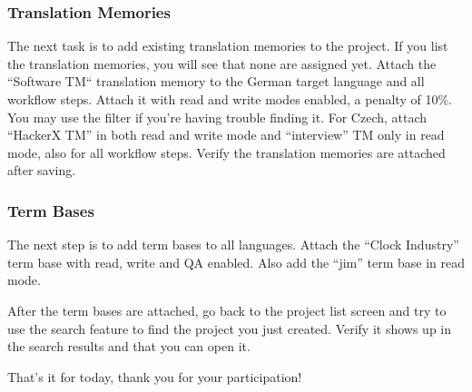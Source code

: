 \subsubsection{Translation Memories}

The next task is to add existing translation memories to the project. If you list the translation memories, you will see that none are assigned yet. Attach the “Software TM“ translation memory to the German target language and all workflow steps. Attach it with read and write modes enabled, a penalty of 10\%. You may use the filter if you’re having trouble finding it. For Czech, attach “HackerX TM” in both read and write mode and “interview” TM only in read mode, also for all workflow steps. Verify the translation memories are attached after saving.

\subsubsection{Term Bases}

The next step is to add term bases to all languages.
Attach the “Clock Industry” term base with read, write and QA enabled. Also add the “jim” term base in read mode. 

After the term bases are attached, go back to the project list screen and try to use the search feature to find the project you just created. Verify it shows up in the search results and that you can open it. 

That's it for today, thank you for your participation!